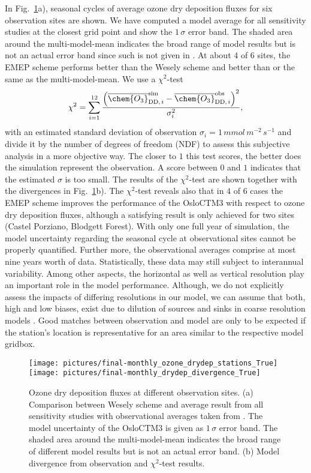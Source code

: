 \documentclass[gmd, manuscript]{copernicus}
\begin{document}
In Fig.~\ref{fig:mmm_drydep_stations}a), seasonal cycles of average ozone dry deposition fluxes for six observation sites are shown. We have computed a model average for all sensitivity studies at the closest grid point and show the $1\,\sigma$ error band. The shaded area around the multi-model-mean indicates the broad range of model results but is not an actual error band since such is not given in \citet{ACP:Hardacre2015}. At about $4$ of $6$ sites, the EMEP scheme performs better than the Wesely scheme and better than or the same as the multi-model-mean. We use a $\chi^2$-test
\begin{equation}
  \chi^2 = \sum_{i=1}^{12}\frac{\left(\overline{\chem{O_3}}_{\text{DD,\,}i}^\text{sim}-\overline{\chem{O_3}}_{\text{DD,\,}i}^\text{obs}\right)^2}{\sigma_i^2},
\end{equation}
with an estimated standard deviation of observation $\sigma_i=1\,\unit{mmol\,m^{-2}\,s^{-1}}$ and divide it by the number of degrees of freedom (NDF) to assess this subjective analysis in a more objective way. The closer to $1$ this test scores, the better does the simulation represent the observation. A score between $0$ and $1$ indicates that the estimated $\sigma$ is too small. The results of the $\chi^2$-test are shown together with the divergences in Fig.~\ref{fig:mmm_drydep_stations}b). The $\chi^2$-test reveals also that in $4$ of $6$ cases the EMEP scheme improves the performance of the OsloCTM3 with respect to ozone dry deposition fluxes, although a satisfying result is only achieved for two sites (Castel Porziano, Blodgett Forest).
With only one full year of simulation, the model uncertainty regarding the seasonal cycle at observational sites cannot be properly quantified. Further more, the observational averages comprise at most nine years worth of data. Statistically, these data may still subject to interannual variability. Among other aspects, the horizontal as well as vertical resolution play an important role in the model performance. Although, we do not explicitly assess the impacts of differing resolutions in our model, we can assume that both, high and low biases, exist due to dilution of sources and sinks in coarse resolution models \citep{AE:Schaap2015}. Good matches between observation and model are only to be expected if the station's location is representative for an area similar to the respective model gridbox.

%
\begin{figure}[t]
  \texttt{[image: pictures/final-monthly\_ozone\_drydep\_stations\_True]}\\
  \texttt{[image: pictures/final-monthly\_drydep\_divergence\_True]}
  \caption{Ozone dry deposition fluxes at different observation sites. (a) Comparison between Wesely scheme and average result from all sensitivity studies with observational averages taken from \citet{ACP:Hardacre2015}. The model uncertainty of the OsloCTM3 is given as $1\,\sigma$ error band. The shaded area around the multi-model-mean indicates the broad range of different model results but is not an actual error band. (b) Model divergence from observation and $\chi^2$-test results.}
  \label{fig:mmm_drydep_stations}
\end{figure}
\end{document}
